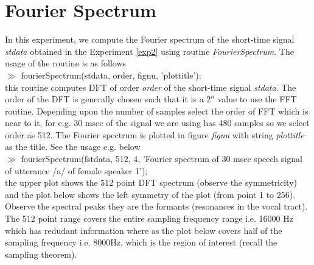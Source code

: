 \section{Fourier Spectrum}
\label{exp4}
In this experiment, we compute the Fourier spectrum of the short-time
signal {\it stdata} obtained in the Experiment \ref{exp2} using
routine {\it FourierSpectrum}. The usage of the routine is as
follows\\[1ex]
\noindent
$\gg$ fourierSpectrum(stdata, order, fignu, 'plottitle');\\[1ex]
\noindent
this routine computes DFT of order {\it order} of the short-time signal
{\it stdata}. The order of the DFT is generally chosen such that it is
a $2^{n}$ value to use the FFT routine. Depending upon the number of
samples select the order of FFT which is near to it, for e.g. 30 msec
of the signal we are using has 480 samples so we select order as
512. The Fourier spectrum is plotted in figure {\it fignu} with string
{\it plottitle} as the title. See the usage e.g. below\\[1ex]
\noindent
$\gg$ fourierSpectrum(fstdata, 512, 4, 'Fourier spectrum of 30 msec
speech signal of utterance /a/ of female speaker 1');\\[1ex]
\noindent
the upper plot shows the 512 point DFT spectrum (observe the
symmetricity) and the plot below shows the left symmetry of the
plot (from point 1 to 256). Observe the spectral peaks they are the
formants (resonances in the vocal tract). The 512 point range covers
the entire sampling frequency range i.e. 16000 Hz which has redudant
information where as the plot below covers half of the sampling
frequency i.e. 8000Hz, which is the region of interest (recall the sampling
theorem).




